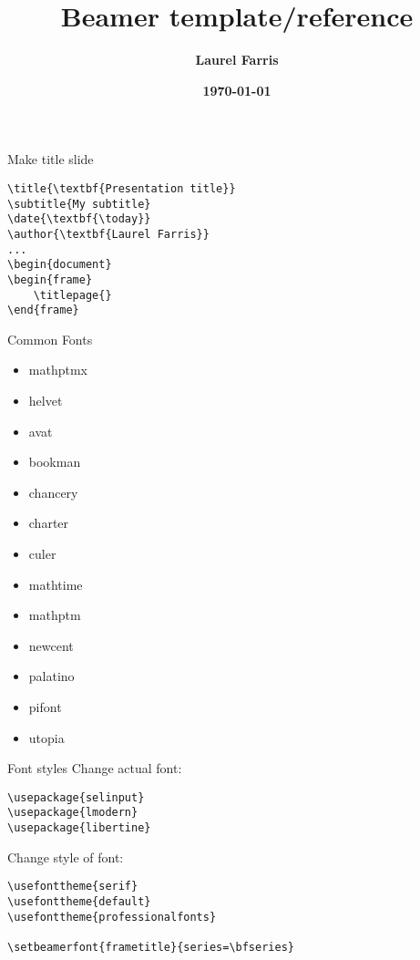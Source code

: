 \documentclass[9pt]{beamer}
\title{\textbf{Beamer template/reference}}
\date{\textbf{\today}}
\author{\textbf{Laurel Farris}}
\begin{document}

\begin{frame}
    \titlepage{}
\end{frame}

\begin{frame}[fragile=singleslide]{Make title slide}
    \begin{verbatim}
\title{\textbf{Presentation title}}
\subtitle{My subtitle}
\date{\textbf{\today}}
\author{\textbf{Laurel Farris}}
...
\begin{document}
\begin{frame}
    \titlepage{}
\end{frame}
    \end{verbatim}
\end{frame}

\begin{frame}[fragile=singleslide]{Common Fonts}
    \begin{itemize}
        \item mathptmx
        \item helvet
        \item avat
        \item bookman
        \item chancery
        \item charter
        \item culer
        \item mathtime
        \item mathptm
        \item newcent
        \item palatino
        \item pifont
        \item utopia
    \end{itemize}
\end{frame}
\begin{frame}[fragile=singleslide]{Font styles}
    Change actual font:
    \begin{verbatim}
\usepackage{selinput}
\usepackage{lmodern}
\usepackage{libertine}
    \end{verbatim}
    Change style of font:
    \begin{verbatim}
\usefonttheme{serif}
\usefonttheme{default}
\usefonttheme{professionalfonts}

\setbeamerfont{frametitle}{series=\bfseries}
    \end{verbatim}
\end{frame}
\end{document}
